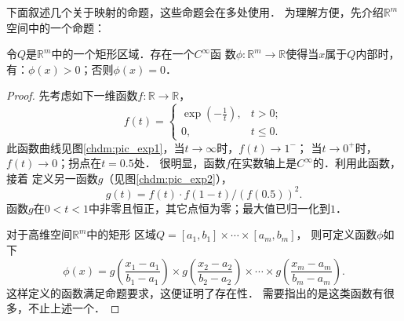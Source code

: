 下面叙述几个关于映射的命题，这些命题会在多处使用．
为理解方便，先介绍$\mathbb{R}^m$空间中的一个命题：
\begin{proposition}\label{chdm:thm_exp1Rm}
    令$Q$是$\mathbb{R}^m$中的一个矩形区域．存在一个$C^\infty$函
    数$\phi:\mathbb{R}^m \to \mathbb{R}$使得当$x$属于$Q$内部时，
    有：$\phi(x)>0$；否则$\phi(x)=0$．
\end{proposition}
\begin{proof}
    先考虑如下一维函数$f:\mathbb{R} \to \mathbb{R}$，
    \begin{equation*}
        f(t)=\begin{cases}
            \exp(-\tfrac{1}{t}), & t > 0 ;\\
            0, & t \leqslant 0 .
        \end{cases}
    \end{equation*}
    此函数曲线见图\ref{chdm:pic_exp1}，当$t\to \infty$时，$f(t)\to 1^-$；
    当$t\to 0^+$时，$f(t)\to 0$；拐点在$t=0.5$处．
    很明显，函数$f$在实数轴上是$C^\infty$的．利用此函数，接着
    定义另一函数$g$（见图\ref{chdm:pic_exp2}），
    \begin{equation}\label{chdm:eqn_g1}
        g(t)=f(t)\cdot f(1-t)/(f(0.5))^2 .
    \end{equation}
    函数$g$在$0<t<1$中非零且恒正，其它点恒为零；最大值已归一化到$1$．
    
    对于高维空间$\mathbb{R}^m$中的矩形
    区域$Q=[a_1,b_1]\times \cdots \times[a_m,b_m]$，
    则可定义函数$\phi$如下
    \begin{equation}\label{chdm:eqn_gexpphi1}
        \phi(x)=g\left(\frac{x_1 -a_1}{b_1-a_1}\right) \times 
        g\left(\frac{x_2 -a_2}{b_2-a_2}\right) \times \cdots \times
        g\left(\frac{x_m -a_m}{b_m-a_m}\right) .
    \end{equation}
    这样定义的函数满足命题要求，这便证明了存在性．
    需要指出的是这类函数有很多，不止上述一个．
\end{proof}


